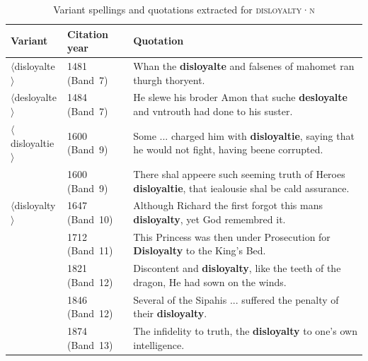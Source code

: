 \documentclass[doc,biblatex]{apa7}
\newcommand\lemma[2]{\textsc{#1·#2}}
\newcommand\spelling[1]{\allowbreak$\langle$#1$\rangle$}
\begin{document}
	\begin{table}
	\begin{center}
	\begin{threeparttable}
	\caption{Variant spellings and quotations extracted for \lemma{disloyalty}{n}}
	\footnotesize
	\begin{tabular}{ll p{10.5cm}}
	\toprule
	Variant & Citation year & Quotation \\
	\midrule
	\spelling{disloyalte}  & 1481 (Band~7) & Whan the \textbf{disloyalte} and falsenes of mahomet ran thurgh thoryent. \\
	\spelling{desloyalte}  & 1484 (Band~7) & He slewe his broder Amon that suche \textbf{desloyalte} and vntrouth had done to his suster. \\
	\spelling{disloyaltie} & 1600 (Band~9) & Some ... charged him with \textbf{disloyaltie}, saying that he would not fight, having beene corrupted. \\
	                       & 1600 (Band~9) & There shal appeere such seeming truth of Heroes \textbf{disloyaltie}, that iealousie shal be cald assurance. \\
	\spelling{disloyalty}  & 1647 (Band~10) & Although Richard the first forgot this mans \textbf{disloyalty}, yet God remembred it. \\
	                       & 1712 (Band~11) & This Princess was then under Prosecution for \textbf{Disloyalty} to the King's Bed. \\
	                       & 1821 (Band~12) & Discontent and \textbf{disloyalty}, like the teeth of the dragon, He had sown on the winds. \\
	                       & 1846 (Band~12) & Several of the Sipahis ... suffered the penalty of their \textbf{disloyalty}. \\
	                       & 1874 (Band~13) & The infidelity to truth, the \textbf{disloyalty} to one's own intelligence. \\
	\bottomrule
	\end{tabular}
	\label{extraction_example}
	\end{threeparttable}
	\end{center}
	\end{table}
\end{document}
